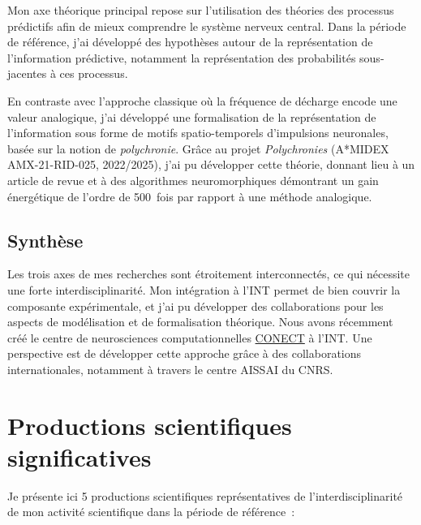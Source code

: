 \documentclass[11pt,french,a4paper,oneside]{article}
\begin{document}
Mon axe théorique principal repose sur l'utilisation des théories des processus prédictifs afin de mieux comprendre le système nerveux central. Dans la période de référence, j'ai développé des hypothèses autour de la représentation de l'information prédictive, notamment la représentation des probabilités sous-jacentes à ces processus.

En contraste avec l'approche classique où la fréquence de décharge encode une valeur analogique, j'ai développé une formalisation de la représentation de l'information sous forme de motifs spatio-temporels d'impulsions neuronales, basée sur la notion de \emph{polychronie}. Grâce au projet \textit{Polychronies} (A*MIDEX AMX-21-RID-025, 2022/2025), j'ai pu développer cette théorie, donnant lieu à un article de revue \citep*{Grimaldi22polychronies} et à des algorithmes neuromorphiques \citep*{Grimaldi23bc} démontrant un gain énergétique de l'ordre de 500~fois par rapport à une méthode analogique.

\subsection{Synthèse}

Les trois axes de mes recherches sont étroitement interconnectés, ce qui nécessite une forte interdisciplinarité. Mon intégration à l'INT permet de bien couvrir la composante expérimentale, et j'ai pu développer des collaborations pour les aspects de modélisation et de formalisation théorique. Nous avons récemment créé le centre de neurosciences computationnelles \href{https://conect-int.github.io/}{CONECT} à l'INT. Une perspective est de développer cette approche grâce à des collaborations internationales, notamment à travers le centre AISSAI du CNRS.

\section{Productions scientifiques significatives}

Je présente ici 5 productions scientifiques représentatives de l'interdisciplinarité de mon activité scientifique dans la période de référence~:
\end{document}
